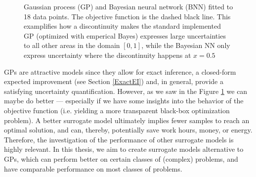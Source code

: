 \begin{figure}[H]%
    \centering
    \qquad
    \caption{Gaussian process (GP) and Bayesian neural network (BNN) fitted to 18 data points. The objective function is the
    dashed black line. This examplifies how a discontinuity makes the standard implemented GP
    (optimized with emperical Bayes) expresses large uncertainties to all other areas in the domain $[0,1]$, while the
    Bayesian NN only express uncertainty where the discontinuity happens at $x =
    0.5$}\label{GP_vs_BNN}
\end{figure}



GPs are attractive models since they allow for exact inference, a closed-form expected improvement
 (see Section \ref{ExactEI}) and, in general, provide a satisfying uncertainty quantification.
 However, as we saw in the Figure \ref{GP_vs_BNN} we can maybe do better --- especially if we have
 some insights into the behavior of the objective function (i.e. yielding a more transparent
 black-box optimization problem). A better surrogate model ultimately implies fewer samples to reach
 an optimal solution, and can, thereby, potentially save work hours, money, or energy. Therefore,
 the investigation of the performance of other surrogate models is highly relevant. In this thesis,
 we aim to create surrogate models alternative to GPs, which can perform better on certain classes
 of (complex) problems, and have comparable performance on most classes of problems. 

